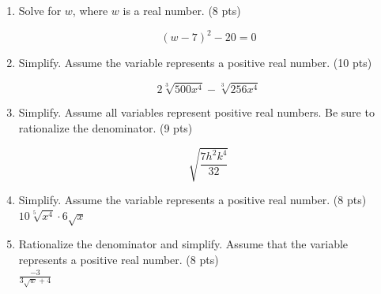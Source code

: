 \documentclass{ximera}
\begin{document}
\begin{enumerate}
$$y-4=\sqrt{-4 y+37}$$

\item Solve for $w$, where $w$ is a real number. (8 pts)

$$(w-7)^{2}-20=0$$

\item Simplify. Assume the variable represents a positive real number. (10 pts)

$$2 \sqrt[3]{500 x^{4}}-\sqrt[3]{256 x^{4}}$$

\item Simplify. Assume all variables represent positive real numbers. Be sure to rationalize the denominator. (9 pts)

$$\sqrt{\frac{7 h^{2} k^{4}}{32}}$$

\item Simplify. Assume the variable represents a positive real number. (8 pts)\\
$10 \sqrt[5]{x^{4}} \cdot 6 \sqrt{x}$

\item Rationalize the denominator and simplify. Assume that the variable represents a positive real number. (8 pts)\\
$\frac{-3}{3 \sqrt{w}+4}$

\end{enumerate}
\end{document}

